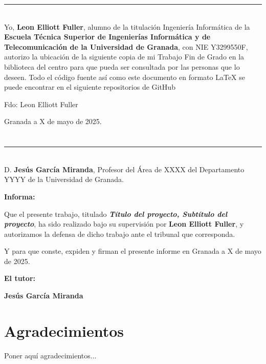 \noindent\rule[-1ex]{\textwidth}{2pt}\\[4.5ex]

Yo, \textbf{Leon Elliott Fuller}, alumno de la titulación Ingeniería Informática de la \textbf{Escuela Técnica Superior
de Ingenierías Informática y de Telecomunicación de la Universidad de Granada}, con NIE Y3299550F, autorizo la
ubicación de la siguiente copia de mi Trabajo Fin de Grado en la biblioteca del centro para que pueda ser
consultada por las personas que lo deseen. Todo el código
fuente así como este documento en formato LaTeX se puede encontrar en
el siguiente repositorios de GitHub

\vspace{6cm}

\noindent Fdo: Leon Elliott Fuller

\vspace{2cm}

\begin{flushright}
Granada a X de mayo de 2025.
\end{flushright}


\chapter*{}
\thispagestyle{empty}

\noindent\rule[-1ex]{\textwidth}{2pt}\\[4.5ex]

D. \textbf{Jesús García Miranda}, Profesor del Área de XXXX del Departamento YYYY de la Universidad de Granada.

\vspace{0.5cm}

\vspace{0.5cm}

\textbf{Informa:}

\vspace{0.5cm}

Que el presente trabajo, titulado \textit{\textbf{Título del proyecto, Subtítulo del proyecto}},
ha sido realizado bajo su supervisión por \textbf{Leon Elliott Fuller}, y autorizamos la defensa de dicho trabajo ante el tribunal
que corresponda.

\vspace{0.5cm}

Y para que conste, expiden y firman el presente informe en Granada a X de mayo de 2025.

\vspace{1cm}

\textbf{El tutor:}

\vspace{5cm}

\noindent \textbf{Jesús García Miranda}

\chapter*{Agradecimientos}
\thispagestyle{empty}

       \vspace{1cm}


Poner aquí agradecimientos...

